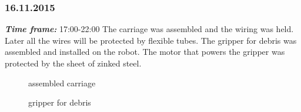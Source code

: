 \subsubsection{16.11.2015}
\textit{\textbf{Time frame:}} 17:00-22:00 \newline
The carriage was assembled and the wiring was held. Later all the wires will be protected by flexible tubes.
The gripper for debris was assembled and installed on the robot. The motor that powers the gripper was protected by the sheet of zinked steel.

  	\begin{figure}[H]
  		\begin{minipage}[h]{0.47\linewidth}
  			\caption{assembled carriage}
  		\end{minipage}
  		\begin{minipage}[h]{0.47\linewidth}
  			\caption{gripper for debris}
  		\end{minipage}
  	\end{figure}
  	
